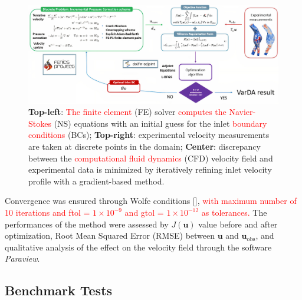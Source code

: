 \begin{figure}
    \centering
    \includegraphics[width=\textwidth]{chapters/chp1/graphics/schema2_upscaled4.jpg}
    \caption{\small \textbf{Top-left}: \textcolor{red}{The finite element} (FE) solver \textcolor{red}{computes the Navier-Stokes} (NS) equations with an initial guess for the inlet \textcolor{red}{boundary conditions} (BCs); \textbf{Top-right}: experimental velocity measurements are taken at discrete points in the domain; \textbf{Center}: discrepancy between the \textcolor{red}{computational fluid dynamics} (CFD) velocity field and experimental data is minimized by iteratively refining inlet velocity profile with a gradient-based method.}
    \label{fig:scheme}
\end{figure}

Convergence was ensured through Wolfe conditions [\cite{Nocedal2006}], \textcolor{red}{with maximum number of 10 iterations and ftol = $1 \times 10^{-9}$ and gtol = $1 \times 10^{-12}$ as tolerances.}
The performances of the method were assessed by $J(\textbf{u})$ value before and after optimization, Root Mean Squared Error (RMSE) between \( \mathbf{u}\) and \( \mathbf{u}_{\text{obs}} \), and qualitative analysis of the effect on the velocity field through the software \emph{Paraview}.

\subsection*{Benchmark Tests}

